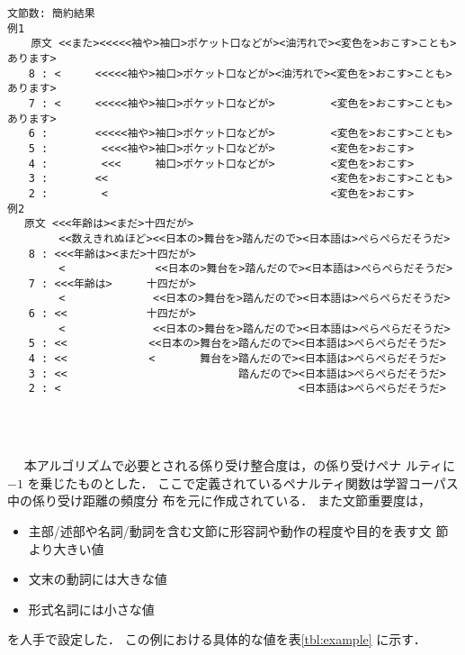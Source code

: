 \begin{footnotesize}
\bigskip
\begin{minipage}{50zw}
\begin{verbatim}
文節数: 簡約結果
例1
　  原文 <<また><<<<<袖や>袖口>ポケット口などが><油汚れで><変色を>おこす>ことも>あります>
　　8 : < 　　 <<<<<袖や>袖口>ポケット口などが><油汚れで><変色を>おこす>ことも>あります>
　　7 : < 　　 <<<<<袖や>袖口>ポケット口などが> 　　　　 <変色を>おこす>ことも>あります>
　　6 :   　　 <<<<<袖や>袖口>ポケット口などが> 　　　　 <変色を>おこす>ことも>
　　5 :   　　  <<<<袖や>袖口>ポケット口などが> 　　　　 <変色を>おこす>
　　4 :  　　   <<< 　　 袖口>ポケット口などが> 　　　　 <変色を>おこす>
　　3 :   　　 <<   　　 　　 　　　　　　　　  　　　　 <変色を>おこす>ことも>
　　2 :   　　  <   　　 　　 　　　　　　　　  　　　　 <変色を>おこす>
例2
　 原文 <<<年齢は><まだ>十四だが>
        <<数えきれぬほど><<日本の>舞台を>踏んだので><日本語は>ぺらぺらだそうだ>
　　8 : <<<年齢は><まだ>十四だが>
        < 　　　  　　　 <<日本の>舞台を>踏んだので><日本語は>ぺらぺらだそうだ>
　　7 : <<<年齢は> 　　 十四だが>
        < 　　　　　　　 <<日本の>舞台を>踏んだので><日本語は>ぺらぺらだそうだ>
　　6 : << 　　　  　　 十四だが>
        < 　　　　　　　 <<日本の>舞台を>踏んだので><日本語は>ぺらぺらだそうだ>
　　5 : <<　　　　　　　 <<日本の>舞台を>踏んだので><日本語は>ぺらぺらだそうだ>
　　4 : <<　　　　　　　 < 　　　 舞台を>踏んだので><日本語は>ぺらぺらだそうだ>
　　3 : <<　　　　　　　   　　　 　　　 踏んだので><日本語は>ぺらぺらだそうだ>
　　2 : < 　　　　　　　   　　　 　　　 　　　　　 <日本語は>ぺらぺらだそうだ>
\end{verbatim}
\end{minipage} \\
\bigskip \\
\end{footnotesize}
　
本アルゴリズムで必要とされる係り受け整合度は，\cite{zhang}の係り受けペナ
ルティに $-1$ を乗じたものとした．
ここで定義されているペナルティ関数は学習コーパス中の係り受け距離の頻度分
布を元に作成されている．
また文節重要度は，
\begin{itemize}
 \item 主部/述部や名詞/動詞を含む文節に形容詞や動作の程度や目的を表す文
       節より大きい値
 \item 文末の動詞には大きな値
 \item 形式名詞には小さな値
\end{itemize}
を人手で設定した．
この例における具体的な値を表\ref{tbl:example} に示す．

